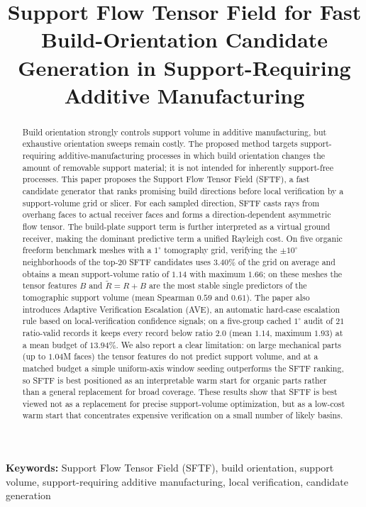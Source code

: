 \documentclass[11pt,a4paper]{article}
\title{Support Flow Tensor Field for Fast Build-Orientation Candidate Generation in Support-Requiring Additive Manufacturing}
\author{}
\date{}
\begin{document}
\maketitle

\begin{abstract}
Build orientation strongly controls support volume in additive manufacturing, but exhaustive orientation sweeps remain costly.
The proposed method targets support-requiring additive-manufacturing processes in which build orientation changes the amount of removable support material; it is not intended for inherently support-free processes.
This paper proposes the Support Flow Tensor Field (SFTF), a fast candidate generator that ranks promising build directions before local verification by a support-volume grid or slicer.
For each sampled direction, SFTF casts rays from overhang faces to actual receiver faces and forms a direction-dependent asymmetric flow tensor.
The build-plate support term is further interpreted as a virtual ground receiver, making the dominant predictive term a unified Rayleigh cost.
On five organic freeform benchmark meshes with a $1^\circ$ tomography grid, verifying the $\pm 10^\circ$ neighborhoods of the top-20 SFTF candidates uses $3.40\%$ of the grid on average and obtains a mean support-volume ratio of $1.14$ with maximum $1.66$; on these meshes the tensor features $B$ and $\tilde R=R+B$ are the most stable single predictors of the tomographic support volume (mean Spearman $0.59$ and $0.61$).
The paper also introduces Adaptive Verification Escalation (AVE), an automatic hard-case escalation rule based on local-verification confidence signals; on a five-group cached $1^\circ$ audit of $21$ ratio-valid records it keeps every record below ratio $2.0$ (mean $1.14$, maximum $1.93$) at a mean budget of $13.94\%$.
We also report a clear limitation: on large mechanical parts (up to $1.04$M faces) the tensor features do not predict support volume, and at a matched budget a simple uniform-axis window seeding outperforms the SFTF ranking, so SFTF is best positioned as an interpretable warm start for organic parts rather than a general replacement for broad coverage.
These results show that SFTF is best viewed not as a replacement for precise support-volume optimization, but as a low-cost warm start that concentrates expensive verification on a small number of likely basins.
\end{abstract}

\noindent\textbf{Keywords:} Support Flow Tensor Field (SFTF), build orientation, support volume, support-requiring additive manufacturing, local verification, candidate generation
\end{document}
